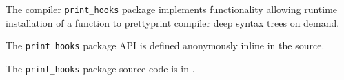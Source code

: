 
The compiler {\tt print\_hooks} package implements functionality allowing 
runtime installation of a function to prettyprint compiler deep syntax trees 
on demand.

The {\tt print\_hooks} package API is defined anonymously inline in the source.

The {\tt print\_hooks} package source code is in .


